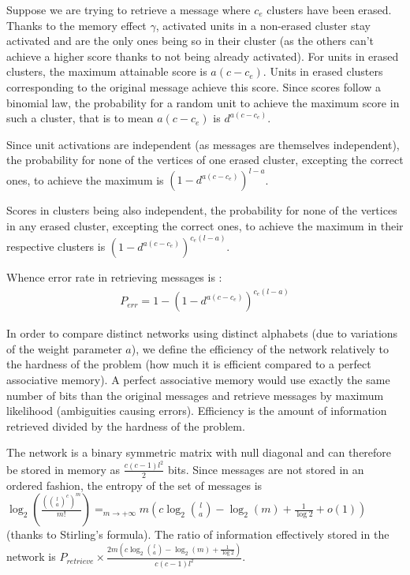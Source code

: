\documentclass[english,10pt,twocolumn]{IEEEtran}
\theoremstyle{definition}
\begin{document}
	Suppose we are trying to retrieve a message where $c_e$ clusters have been erased. %
	Thanks to the memory effect $\gamma$, activated units in a non-erased cluster stay activated and are the only ones being so in their cluster (as the others can't achieve a higher score thanks to not being already activated). For units in erased clusters, the maximum attainable score is $a(c - c_e)$. Units in erased clusters corresponding to the original message achieve this score. Since scores follow a binomial law, the probability for a random unit to achieve the maximum score in such a cluster, that is to mean $a(c-c_e)$ is $d^{a(c-c_e)}$.
	
	
	Since unit activations are independent (as messages are themselves independent), the probability for none of the vertices of one erased cluster, excepting the correct ones, to achieve the maximum is $\left(1 - d^	{a(c-c_e)}\right)^{l-a}$.
	
	Scores in clusters being also independent, the probability for none of the vertices in any erased cluster, excepting the correct ones, to achieve the maximum in their respective clusters is $\left(1 - d^	{a(c-c_e)}\right)^{c_e(l-a)}$.
	
	Whence error rate in retrieving messages is : 
	\begin{align}	
	P_{err} = 1 -	\left(1 - d^	{a(c-c_e)}\right)^{c_e(l-a)} 
	\end{align}	 
	
	In order to compare distinct networks using distinct alphabets (due to variations of the weight parameter $a$), we define the efficiency of the network relatively to the hardness of the problem (how much it is efficient compared to a perfect associative memory). A perfect associative memory would use exactly the same number of bits than the original messages and retrieve messages by maximum likelihood (ambiguities causing errors). Efficiency is the amount of information retrieved divided by the hardness of the problem.
	
	The network is a binary symmetric matrix with null diagonal and can therefore be stored in memory as $\frac{c(c-1) l^2}{2}$ bits. Since messages are not stored in an ordered fashion, the entropy of the set of messages is $\log_2(\frac{({l \choose a}^c)^m}{m!}) \mathop{=}_{m \rightarrow +\infty} m(c \log_2{l \choose a } - \log_2(m) + \frac{1}{\log 2} + o(1)) $ (thanks to  Stirling's formula). The ratio of information effectively stored in the network is $P_{retrieve} \times  \frac{2m \left(c \log_2{l \choose a } - \log_2(m) + \frac{1}{\log 2} \right)}{c(c-1)l^2}$.
	
\end{document}
